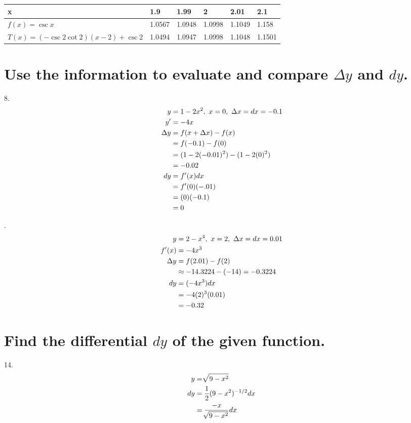 \documentclass[11pt]{article}
\newcommand*{\next}{\noindent}
\newcommand*{\set}{\setcounter{equation}{0}}
\begin{document}
\begin{flushleft}
    \begin{table}[h]
        \begin{tabular}{|l|l|l|l|l|l|}
        \hline
            x & 1.9 & 1.99 & 2 & 2.01 & 2.1\\\hline
            $f(x)=\csc x$ & 1.0567 & 1.0948 & 1.0998 & 1.1049 & 1.158\\\hline
            $T(x)=(-\csc 2\cot 2)(x-2)+\csc 2$ & 1.0494 & 1.0947 & 1.0998 & 1.1048 & 1.1501\\
        \hline
        \end{tabular}
    \end{table}
\end{flushleft}

\section{Use the information to evaluate and compare $\Delta y$ and $dy$.}
8.\begin{align}
    \set
    y&=1-2x^2,\,\, x=0,\,\, \Delta x=dx=-0.1\\
    y'&=-4x\\
    \Delta y&=f(x+\Delta x)-f(x)\\
    &=f(-0.1)-f(0)\\
    &=(1-2(-0.01)^2)-(1-2(0)^2)\\
    &=-0.02\\
    dy&=f'(x)dx\\
    &=f'(0)(-.01)\\
    &=(0)(-0.1)\\
    &=0
\end{align}

\next
10.\begin{align}
    \set
    y&=2-x^4,\,\, x=2,\,\, \Delta x=dx=0.01\\
    f'(x)&=-4x^3\\
    \Delta y&=f(2.01)-f(2)\\
    &\approx -14.3224-(-14)=-0.3224\\
    dy&=(-4x^3)dx\\
    &=-4(2)^3(0.01)\\
    &=-0.32
\end{align}

\section{Find the differential $dy$ of the given function.}
14.\begin{align}
    \set
    y&=\sqrt[]{9-x^2}\\
    dy&=\frac{1}{2}(9-x^2)^{-1/2}dx\\
    &=\frac{-x}{\sqrt[]{9-x^2}}dx
\end{align}
\end{document}
